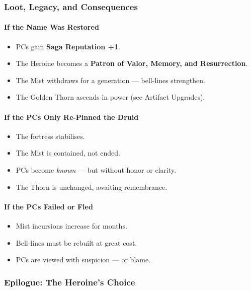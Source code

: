 \documentclass[11pt]{article}
\begin{document}
\subsubsection*{Loot, Legacy, and Consequences}

\paragraph{If the Name Was Restored}
\begin{itemize}
  \item PCs gain \textbf{Saga Reputation +1}.
  \item The Heroine becomes a \textbf{Patron of Valor, Memory, and Resurrection}.
  \item The Mist withdraws for a generation --- bell-lines strengthen.
  \item The Golden Thorn ascends in power (see Artifact Upgrades).
\end{itemize}

\paragraph{If the PCs Only Re-Pinned the Druid}
\begin{itemize}
  \item The fortress stabilises.
  \item The Mist is contained, not ended.
  \item PCs become \textit{known} --- but without honor or clarity.
  \item The Thorn is unchanged, awaiting remembrance.
\end{itemize}

\paragraph{If the PCs Failed or Fled}
\begin{itemize}
  \item Mist incursions increase for months.
  \item Bell-lines must be rebuilt at great cost.
  \item PCs are viewed with suspicion --- or blame.
\end{itemize}

\subsubsection*{Epilogue: The Heroine's Choice}
\end{document}
